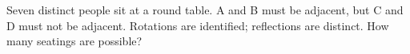 Seven distinct people sit at a round table. A and B must be adjacent, but C and D must not be adjacent. Rotations are identified; reflections are distinct. How many seatings are possible?
